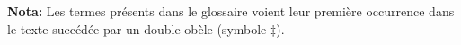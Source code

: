 \newlength{\currentparskip}
\setlength{\currentparskip}{\parskip}
\setlength{\parskip}{0pt}
\tableofcontents


\newpage
\begingroup
  \listoffigures
  \listoftables
  \listoflistings
  
	\bigskip\null\bigskip

	\noindent\textbf{Nota:} Les termes présents dans le glossaire voient leur première occurrence dans le texte succédée par un double obèle (symbole $\ddagger$).
\endgroup
\setlength{\parskip}{\currentparskip}